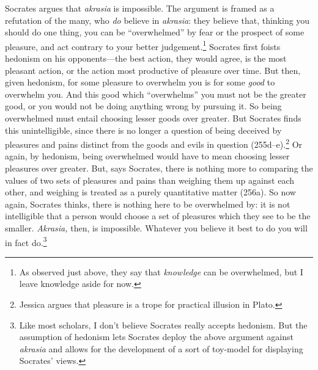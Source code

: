 ﻿\documentclass[11pt]{amsart}
\begin{document}

Socrates argues that \emph{akrasia} is impossible. The argument is framed as a refutation of the many, who \emph{do} believe in \emph{akrasia}: they believe that, thinking you should do one thing, you can be ``overwhelmed'' by fear or the prospect of some pleasure, and act contrary to your better judgement.\footnote{As observed just above, they say that \emph{knowledge} can be overwhelmed, but I leave knowledge aside for now.} Socrates first foists hedonism on his opponents---the best action, they would agree, is the most pleasant action, or the action most productive of pleasure over time. But then, given hedonism, for some pleasure to overwhelm you is for some \emph{good} to overwhelm you. And this good which ``overwhelms'' you must not be the greater good, or you would not be doing anything wrong by pursuing it. So being overwhelmed must entail choosing lesser goods over greater. But Socrates finds this unintelligible, since there is no longer a question of being deceived by pleasures and pains distinct from the goods and evils in question (255d--e).\footnote{Jessica \citet{moss2006pai} argues that pleasure is a trope for practical illusion in Plato.} Or again, by hedonism, being overwhelmed would have to mean choosing lesser pleasures over greater. But, says Socrates, there is nothing more to comparing the values of two sets of pleasures and pains than weighing them up against each other, and weighing is treated as a purely quantitative matter (256a).  So now again, Socrates thinks, there is nothing here to be overwhelmed by: it is not intelligible that a person would choose a set of pleasures which they see to be the smaller. \emph{Akrasia,} then, is impossible. Whatever you believe it best to do you will in fact do.\footnote{Like most scholars, I don't believe Socrates really accepts hedonism. But the assumption of hedonism lets Socrates deploy the above argument against \emph{akrasia} and allows for the development of a sort of toy-model for displaying Socrates' views.}%



\end{document}
